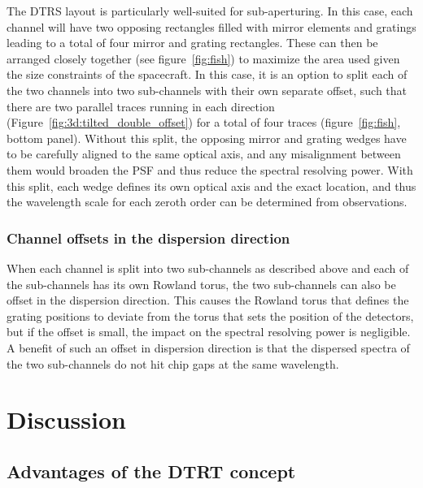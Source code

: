 \documentclass[twocolumn]{aastex631}
\begin{document}
The DTRS layout is particularly well-suited for sub-aperturing. In this case, each channel will have two opposing rectangles filled with mirror elements and gratings leading to a total of four mirror and grating rectangles. These can then be arranged closely together (see figure~\ref{fig:fish}) to maximize the area used given the size constraints of the spacecraft. In this case, it is an option to split each of the two channels into two sub-channels with their own separate offset, such that there are two parallel traces running in each direction (Figure~\ref{fig:3d:tilted_double_offset}) for a total of four traces (figure~\ref{fig:fish}, bottom panel). Without this split, the opposing mirror and grating wedges have to be carefully aligned to the same optical axis, and any misalignment between them would broaden the PSF and thus reduce the spectral resolving power. With this split, each wedge defines its own optical axis and the exact location, and thus the wavelength scale for each zeroth order can be determined from observations.

\subsubsection{Channel offsets in the dispersion direction}
When each channel is split into two sub-channels as described above and each of the sub-channels has its own Rowland torus, %
the two sub-channels can also be offset in the dispersion direction. This causes the Rowland torus that defines the grating positions to deviate from the torus that sets the position of the detectors, but if the offset is small, the impact on the spectral resolving power is negligible. A benefit of such an offset in dispersion direction is that the dispersed spectra of the two sub-channels do not hit chip gaps at the same wavelength. %


\section{Discussion}
\label{sect:discussion}

\subsection{Advantages of the DTRT concept}
\end{document}
